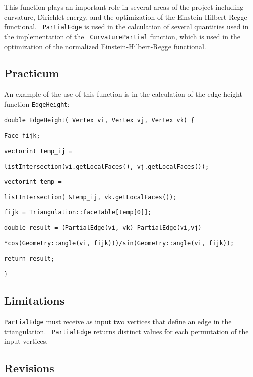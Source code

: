 This function plays an important role in several areas of the project
including curvature, Dirichlet energy, and the optimization of the
Einstein-Hilbert-Regge functional. \ \texttt{PartialEdge} is used in the
calculation of several quantities used in the implementation of the \texttt{%
CurvaturePartial} function, which is used in the optimization of the
normalized Einstein-Hilbert-Regge functional.

\subsection*{Practicum}

An example of the use of this function is in the calculation of the edge
height function \texttt{EdgeHeight}:

\qquad \texttt{double EdgeHeight( Vertex vi, Vertex vj, Vertex vk) \{}

\qquad\qquad\texttt{Face fijk;}

\qquad\qquad\texttt{vector\TEXTsymbol{<}int\TEXTsymbol{>} temp\_ij = }

\qquad\qquad\qquad\texttt{listIntersection(vi.getLocalFaces(),
vj.getLocalFaces());}

\qquad\qquad\texttt{vector\TEXTsymbol{<}int\TEXTsymbol{>} temp = }

\qquad\qquad\qquad\texttt{listIntersection( \&temp\_ij, vk.getLocalFaces());}

\qquad\qquad\texttt{fijk = Triangulation::faceTable[temp[0]];}

\qquad \qquad \texttt{double result = (PartialEdge(vi, vk)-PartialEdge(vi,vj)%
}

\qquad\qquad\qquad\texttt{*cos(Geometry::angle(vi,
fijk)))/sin(Geometry::angle(vi, fijk));}

\qquad\qquad\texttt{return result;}

\qquad\qquad\texttt{\}}

\subsection*{Limitations}

\texttt{PartialEdge} must receive as input two vertices that define an edge
in the triangulation. \ \texttt{PartialEdge} returns distinct values for
each permutation of the input vertices. \ 

\subsection*{Revisions}

